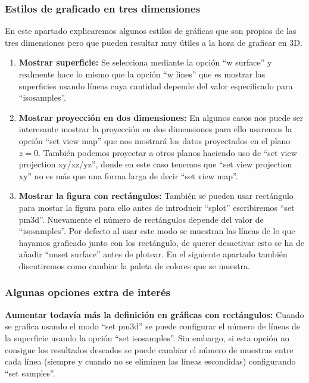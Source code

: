 \documentclass[11pt,a4paper,twoside,pdf]{article}
\numberwithin{equation}{section}
\begin{document}
\subsubsection{Estilos de graficado en tres dimensiones}

En este apartado explicaremos algunos estilos de gráficas que son propios de las tres dimensiones pero que pueden resultar muy útiles a la hora de graficar en 3D.

\begin{enumerate}
	\item \textbf{Mostrar superficie:} Se selecciona mediante la opción ``w surface'' y realmente hace lo mismo que la opción ``w lines'' que es mostrar las superficies usando líneas cuya cantidad depende del valor especificado para ``isosamples''.
	\item \textbf{Mostrar proyección en dos dimensiones:} En algunos casos nos puede ser interesante mostrar la proyección en dos dimensiones para ello usaremos la opción ``set view map'' que nos mostrará los datos proyectados en el plano $z=0$. También podemos proyectar a otros planos haciendo uso de ``set view projection xy/xz/yz'', donde en este caso tenemos que ``set view projection xy'' no es más que una forma larga de decir ``set view map''. 
	\item \textbf{Mostrar la figura con rectángulos:} También se pueden usar rectángulo para mostar la figura para ello antes de introducir ``splot'' escribiremos ``set pm3d''. Nuevamente el número de rectángulos depende del valor de ``isosamples''. Por defecto al usar este modo se muestran las líneas de lo que hayamos graficado junto con los rectángulo, de querer desactivar esto se ha de añadir ``unset surface'' antes de plotear. En el siguiente apartado también discutiremos como cambiar la paleta de colores que se muestra.
\end{enumerate}

\subsubsection{Algunas opciones extra de interés}

\textbf{Aumentar todavía más la definición en gráficas con rectángulos:} Cuando se grafica usando el modo ``set pm3d'' se puede configurar el número de líneas de la superficie usando la opción ``set isosamples''. Sin embargo, si esta opción no consigue los resultados deseados se puede cambiar el número de muestras entre cada línea (siempre y cuando no se eliminen las líneas escondidas) configurando ``set samples''. \\
\end{document}
